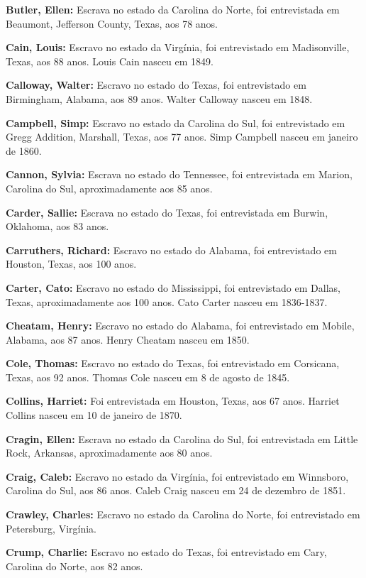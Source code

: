 \textbf{Butler, Ellen:} Escrava no estado da Carolina do Norte, foi
entrevistada em Beaumont, Jefferson County, Texas, aos 78 anos.

\textbf{Cain, Louis:} Escravo no estado da Virgínia, foi entrevistado em
Madisonville, Texas, aos 88 anos. Louis Cain nasceu em 1849.

\textbf{Calloway, Walter:} Escravo no estado do Texas, foi entrevistado
em Birmingham, Alabama, aos 89 anos. Walter Calloway nasceu em 1848.

\textbf{Campbell, Simp:} Escravo no estado da Carolina do Sul, foi
entrevistado em Gregg Addition, Marshall, Texas, aos 77 anos. Simp
Campbell nasceu em janeiro de 1860.

\textbf{Cannon, Sylvia:} Escrava no estado do Tennessee, foi
entrevistada em Marion, Carolina do Sul, aproximadamente aos 85 anos.

\textbf{Carder, Sallie:} Escrava no estado do Texas, foi entrevistada em
Burwin, Oklahoma, aos 83 anos.

\textbf{Carruthers, Richard:} Escravo no estado do Alabama, foi
entrevistado em Houston, Texas, aos 100 anos.

\textbf{Carter, Cato:} Escravo no estado do Mississippi, foi
entrevistado em Dallas, Texas, aproximadamente aos 100 anos. Cato Carter
nasceu em 1836-1837.

\textbf{Cheatam, Henry:} Escravo no estado do Alabama, foi entrevistado
em Mobile, Alabama, aos 87 anos. Henry Cheatam nasceu em 1850.

\textbf{Cole, Thomas:} Escravo no estado do Texas, foi entrevistado em
Corsicana, Texas, aos 92 anos. Thomas Cole nasceu em 8 de agosto de
1845.

\textbf{Collins, Harriet:} Foi entrevistada em Houston, Texas, aos 67
anos. Harriet Collins nasceu em 10 de janeiro de 1870.

\textbf{Cragin, Ellen:} Escrava no estado da Carolina do Sul, foi
entrevistada em Little Rock, Arkansas, aproximadamente aos 80 anos.

\textbf{Craig, Caleb:} Escravo no estado da Virgínia, foi entrevistado
em Winnsboro, Carolina do Sul, aos 86 anos. Caleb Craig nasceu em 24 de
dezembro de 1851.

\textbf{Crawley, Charles:} Escravo no estado da Carolina do Norte, foi
entrevistado em Petersburg, Virgínia.

\textbf{Crump, Charlie:} Escravo no estado do Texas, foi entrevistado em
Cary, Carolina do Norte, aos 82 anos.

